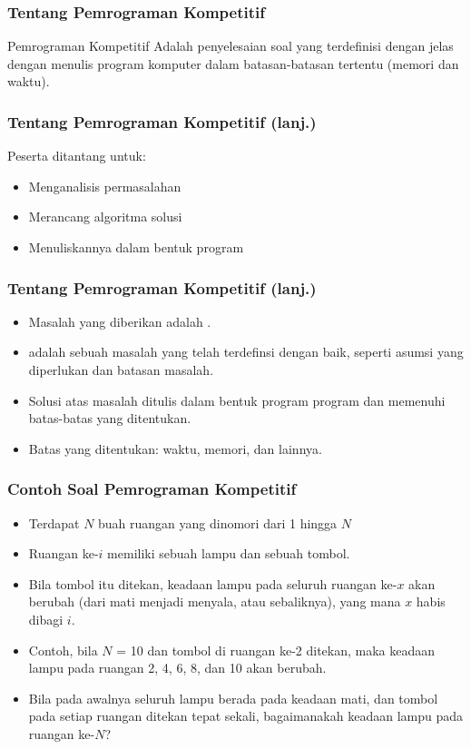 \begin{frame}
\frametitle{Tentang Pemrograman Kompetitif}
\begin{block}{Pemrograman Kompetitif}
Adalah penyelesaian soal yang terdefinisi dengan jelas dengan menulis program komputer dalam batasan-batasan tertentu (memori dan waktu).
\end{block}
\end{frame}

\begin{frame}
\frametitle{Tentang Pemrograman Kompetitif (lanj.)}
Peserta ditantang untuk:
\begin{itemize}
  \item Menganalisis permasalahan
  \item Merancang algoritma solusi
  \item Menuliskannya dalam bentuk program
\end{itemize}
\end{frame}

\begin{frame}
\frametitle{Tentang Pemrograman Kompetitif (lanj.)}
\begin{itemize}
  \item Masalah yang diberikan adalah .
  \item {} adalah sebuah masalah yang telah terdefinsi dengan baik, seperti asumsi yang diperlukan dan batasan masalah.
  \item Solusi atas masalah ditulis dalam bentuk program program dan memenuhi batas-batas yang ditentukan.
  \item Batas yang ditentukan: waktu, memori, dan lainnya.
\end{itemize}
\end{frame}

\begin{frame}
\frametitle{Contoh Soal Pemrograman Kompetitif}
\begin{itemize}
  \item Terdapat $N$ buah ruangan yang dinomori dari 1 hingga $N$
  \item Ruangan ke-$i$ memiliki sebuah lampu dan sebuah tombol.
  \item Bila tombol itu ditekan, keadaan lampu pada seluruh ruangan ke-$x$ akan berubah (dari mati menjadi menyala, atau sebaliknya), yang mana $x$ habis dibagi $i$.
  \item Contoh, bila $N$ = 10 dan tombol di ruangan ke-2 ditekan, maka keadaan lampu pada ruangan 2, 4, 6, 8, dan 10 akan berubah.
  \item Bila pada awalnya seluruh lampu berada pada keadaan mati, dan tombol pada setiap ruangan ditekan tepat sekali, bagaimanakah keadaan lampu pada ruangan ke-$N$?
\end{itemize}
\end{frame}

